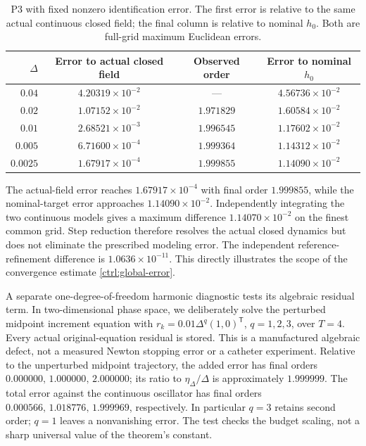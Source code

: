 \begin{table}[t]
\centering
\caption{P3 with fixed nonzero identification error. The first error is relative to the same actual continuous closed field; the final column is relative to nominal $h_0$. Both are full-grid maximum Euclidean errors.}
\label{num:closed-convergence}
\begin{tabular}{rccc}
\toprule
$\Delta$ & Error to actual closed field & Observed order & Error to nominal $h_0$\\
\midrule
$0.04$ & $4.20319\times10^{-2}$ & --- & $4.56736\times10^{-2}$ \\
$0.02$ & $1.07152\times10^{-2}$ & $1.971829$ & $1.60584\times10^{-2}$ \\
$0.01$ & $2.68521\times10^{-3}$ & $1.996545$ & $1.17602\times10^{-2}$ \\
$0.005$ & $6.71600\times10^{-4}$ & $1.999364$ & $1.14312\times10^{-2}$ \\
$0.0025$ & $1.67917\times10^{-4}$ & $1.999855$ & $1.14090\times10^{-2}$ \\
\bottomrule
\end{tabular}
\end{table}

The actual-field error reaches $1.67917\times10^{-4}$ with final order
$1.999855$, while the nominal-target error approaches
$1.14090\times10^{-2}$. Independently integrating the two continuous
models gives a maximum difference $1.14070\times10^{-2}$ on the
finest common grid. Step reduction therefore resolves the actual closed
dynamics but does not eliminate the prescribed modeling error.
The independent reference-refinement difference is $1.0636\times10^{-11}$.
This directly illustrates the scope of the convergence estimate
\eqref{ctrl:global-error}.

\label{num:defect-budget}
A separate one-degree-of-freedom harmonic diagnostic tests its algebraic
residual term. In two-dimensional phase space, we deliberately solve
the perturbed midpoint increment equation with
$r_k=0.01\Delta^q(1,0)^{\mathsf T}$, $q=1,2,3$, over $T=4$.
Every actual original-equation residual is stored. This is a manufactured
algebraic defect, not a measured Newton stopping error or a catheter
experiment. Relative to the unperturbed midpoint trajectory, the added
error has final orders $0.000000,\,1.000000,\,2.000000$; its ratio to
$\eta_\Delta/\Delta$ is approximately $1.999999$.
The total error against the continuous oscillator has final orders
$0.000566,\,1.018776,\,1.999969$, respectively. In particular $q=3$ retains
second order; $q=1$ leaves a nonvanishing error. The test checks the
budget scaling, not a sharp universal value of the theorem's constant.

